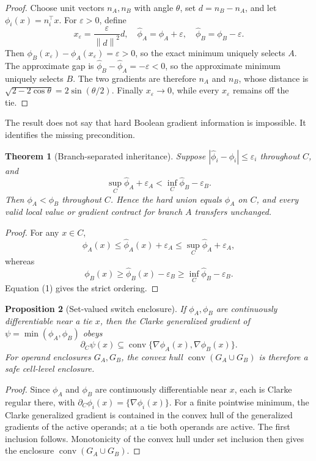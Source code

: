 \documentclass[11pt]{article}
\newtheorem{theorem}{Theorem}
\newtheorem{proposition}[theorem]{Proposition}
\theoremstyle{definition}
\newcommand{\norm}[1]{\left\lVert#1\right\rVert}
\begin{document}
\begin{proof}
Choose unit vectors \(n_A,n_B\) with angle \(\theta\), set \(d=n_B-n_A\), and
let \(\phi_i(x)=n_i^\top x\).  For \(\varepsilon>0\), define
\[
x_\varepsilon=\frac{\varepsilon}{\norm{d}^2}d,
\quad
\widehat\phi_A=\phi_A+\varepsilon,
\quad
\widehat\phi_B=\phi_B-\varepsilon.
\]
Then
\(
\phi_B(x_\varepsilon)-\phi_A(x_\varepsilon)=\varepsilon>0
\), so the exact minimum uniquely selects \(A\).  The approximate gap is
\(
\widehat\phi_B-\widehat\phi_A=-\varepsilon<0
\), so the approximate minimum uniquely selects \(B\).  The two gradients are
therefore \(n_A\) and \(n_B\), whose distance is
\(
\sqrt{2-2\cos\theta}=2\sin(\theta/2)
\).  Finally \(x_\varepsilon\to0\), while every \(x_\varepsilon\) remains off
the tie.
\end{proof}

The result does not say that hard Boolean gradient information is impossible.
It identifies the missing precondition.

\begin{theorem}[Branch-separated inheritance]
\label{thm:branch}
Suppose \( |\widehat\phi_i-\phi_i|\le\varepsilon_i \) throughout \(C\), and
\[
\sup_C\widehat\phi_A+\varepsilon_A
<\inf_C\widehat\phi_B-\varepsilon_B. \tag{1}
\]
Then \(\phi_A<\phi_B\) throughout \(C\).  Hence the hard union equals
\(\phi_A\) on \(C\), and every valid local value or gradient contract for
branch \(A\) transfers unchanged.
\end{theorem}

\begin{proof}
For any \(x\in C\),
\[
\phi_A(x)\le\widehat\phi_A(x)+\varepsilon_A
\le\sup_C\widehat\phi_A+\varepsilon_A,
\]
whereas
\[
\phi_B(x)\ge\widehat\phi_B(x)-\varepsilon_B
\ge\inf_C\widehat\phi_B-\varepsilon_B.
\]
Equation (1) gives the strict ordering.
\end{proof}

\begin{proposition}[Set-valued switch enclosure]
\label{prop:clarke}
If \(\phi_A,\phi_B\) are continuously differentiable near a tie \(x\), then the
Clarke generalized gradient of \(\psi=\min(\phi_A,\phi_B)\) obeys
\[
\partial_C\psi(x)
\subseteq\operatorname{conv}
\{\nabla\phi_A(x),\nabla\phi_B(x)\}.
\]
For operand enclosures \(G_A,G_B\), the convex hull
\(
\operatorname{conv}(G_A\cup G_B)
\)
is therefore a safe cell-level enclosure.
\end{proposition}

\begin{proof}
Since \(\phi_A\) and \(\phi_B\) are continuously differentiable near \(x\),
each is Clarke regular there, with
\(\partial_C\phi_i(x)=\{\nabla\phi_i(x)\}\).  For a finite pointwise minimum,
the Clarke generalized gradient is contained in the convex hull of the
generalized gradients of the active operands; at a tie both operands are
active.  The first inclusion follows.  Monotonicity of the convex hull under
set inclusion then gives the enclosure
\(\operatorname{conv}(G_A\cup G_B)\).
\end{proof}
\end{document}
